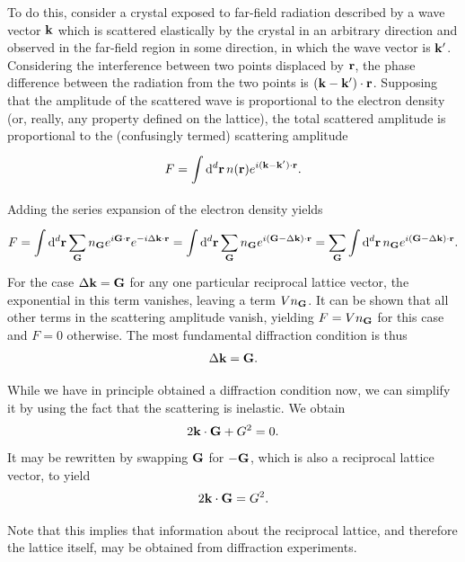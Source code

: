 To do this, consider a crystal exposed to far-field radiation described by a wave vector $\vb{k}$ which is scattered elastically by the crystal in an arbitrary direction and observed in the far-field region in some direction, in which the wave vector is $\vb{k}^{\prime}$. Considering the interference between two points displaced by $\vb{r}$, the phase difference between the radiation from the two points is $(\vb{k} - \vb{k}^{\prime})\cdot\vb{r}$. Supposing that the amplitude of the scattered wave is proportional to the electron density (or, really, any property defined on the lattice), the total scattered amplitude is proportional to the (confusingly termed) scattering amplitude
\begin{align*}
	F = \int\limits_{}^{}\dd[d]{\vb{r}}n(\vb{r})e^{i(\vb{k} - \vb{k}^{\prime})\cdot\vb{r}}.
\end{align*}
Adding the series expansion of the electron density yields
\begin{align*}
	F = \int\limits_{}^{}\dd[d]{\vb{r}}\sum\limits_{\vb{G}}n_{\vb{G}}e^{i\vb{G}\cdot\vb{r}}e^{-i\Delta\vb{k}\cdot\vb{r}} = \int\limits_{}^{}\dd[d]{\vb{r}}\sum\limits_{\vb{G}}n_{\vb{G}}e^{i(\vb{G} - \Delta\vb{k})\cdot\vb{r}} = \sum\limits_{\vb{G}}\int\limits_{}^{}\dd[d]{\vb{r}}n_{\vb{G}}e^{i(\vb{G} - \Delta\vb{k})\cdot\vb{r}}.
\end{align*}
For the case $\Delta\vb{k} = \vb{G}$ for any one particular reciprocal lattice vector, the exponential in this term vanishes, leaving a term $Vn_{\vb{G}}$. It can be shown that all other terms in the scattering amplitude vanish, yielding $F = Vn_{\vb{G}}$ for this case and $F = 0$ otherwise. The most fundamental diffraction condition is thus
\begin{align*}
	\Delta\vb{k} = \vb{G}.
\end{align*}

While we have in principle obtained a diffraction condition now, we can simplify it by using the fact that the scattering is inelastic. We obtain
\begin{align*}
	2\vb{k}\cdot\vb{G} + G^{2} = 0.
\end{align*}
It may be rewritten by swapping $\vb{G}$ for $-\vb{G}$, which is also a reciprocal lattice vector, to yield
\begin{align*}
	2\vb{k}\cdot\vb{G} = G^{2}.
\end{align*}

Note that this implies that information about the reciprocal lattice, and therefore the lattice itself, may be obtained from diffraction experiments.

